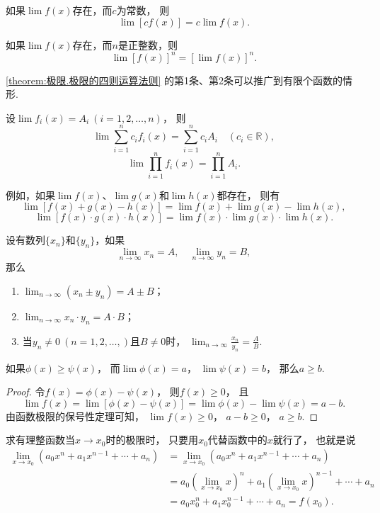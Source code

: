 \begin{corollary}
如果\(\lim f(x)\)存在，而\(c\)为常数，
则\[\lim [c f(x)] = c \lim f(x).\]
\end{corollary}

\begin{corollary}
如果\(\lim f(x)\)存在，而\(n\)是正整数，则\[\lim [f(x)]^n = [\lim f(x)]^n.\]
\end{corollary}

\cref{theorem:极限.极限的四则运算法则} 的第1条、第2条可以推广到有限个函数的情形.
\begin{corollary}
设\(\lim f_i(x) = A_i\ (i=1,2,\dotsc,n)\)，
则\[
	\lim \sum_{i=1}^n c_i f_i(x) = \sum_{i=1}^n c_i A_i
	\quad(c_i\in\mathbb{R}),
\]\[
	\lim \prod_{i=1}^n f_i(x) = \prod_{i=1}^n A_i.
\]
\end{corollary}
例如，如果\(\lim f(x)\)、\(\lim g(x)\)和\(\lim h(x)\)都存在，
则有\[
	\lim[f(x) + g(x) - h(x)] = \lim f(x) + \lim g(x) - \lim h(x),
\]\[
	\lim[f(x) \cdot g(x) \cdot h(x)] = \lim f(x) \cdot \lim g(x) \cdot \lim h(x).
\]

\begin{theorem}
设有数列\(\{x_n\}\)和\(\{y_n\}\)，如果\[
	\lim_{n\to\infty}x_n = A,
	\quad
	\lim_{n\to\infty}y_n = B,
\]
那么\begin{enumerate}
	\item \(\lim_{n\to\infty}{(x_n \pm y_n)}=A \pm B\)；
	\item \(\lim_{n\to\infty}{x_n \cdot y_n}=A \cdot B\)；
	\item 当\(y_n \neq 0\ (n=1,2,\dotsc,)\)且\(B \neq 0\)时，
	\(\lim_{n\to\infty}{\frac{x_n}{y_n}}=\frac{A}{B}\).
\end{enumerate}
\end{theorem}

\begin{theorem}
如果\(\phi(x) \geq \psi(x)\)，
而\(\lim \phi(x)=a\)，
\(\lim \psi(x)=b\)，
那么\(a \geq b\).
\begin{proof}
令\(f(x) = \phi(x) - \psi(x)\)，
则\(f(x) \geq 0\)，
且\[
	\lim f(x) = \lim[\phi(x) - \psi(x)]
	= \lim \phi(x) - \lim \psi(x)
	= a - b.
\]
由函数极限的保号性定理可知，
\(\lim f(x) \geq 0\)，
\(a - b \geq 0\)，
\(a \geq b\).
\end{proof}
\end{theorem}

\begin{example}\label{example:极限.有理整函数在一点的极限}
求有理整函数当\(x\to x_0\)时的极限时，
只要用\(x_0\)代替函数中的\(x\)就行了，
也就是说
\def\lx{\left(\lim_{x \to x_0} x\right)}
\begin{align*}
	\lim_{x \to x_0} (a_0 x^n + a_1 x^{n-1} + \dotsb + a_n)
	&= \lim_{x \to x_0}{(a_0 x^n + a_1 x^{n-1} + \dotsb + a_n)} \\
	&= a_0 \lx^n + a_1 \lx^{n-1} + \dotsb + a_n \\
	&= a_0 x_0^n + a_1 x_0^{n-1} + \dotsb + a_n
	= f(x_0).
\end{align*}
\end{example}

